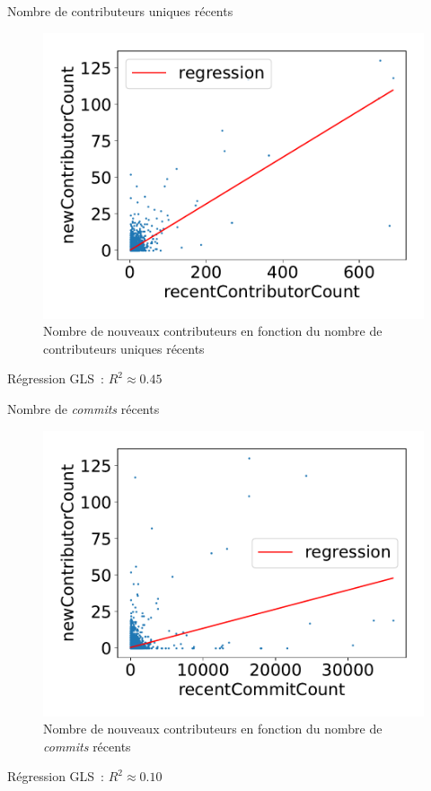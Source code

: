 \documentclass[usenames,dvipsnames,10pt]{beamer}
\begin{document}
\begin{frame}{Nombre de contributeurs uniques récents}
    \begin{figure}
        \includegraphics[width=.5\textwidth]{../experiment/data_analysis/recentContributorCountRegression_linearScale}
        \caption{%
            Nombre de nouveaux contributeurs en fonction du nombre de
            contributeurs uniques récents
        }
    \end{figure}

    Régression GLS : $R^2 \approx 0.45$

\end{frame}

\begin{frame}{Nombre de \emph{commits} récents}
    \begin{figure}
        \includegraphics[width=.5\textwidth]{../experiment/data_analysis/recentCommitCountRegression_linearScale}
        \caption{%
            Nombre de nouveaux contributeurs en fonction du nombre de
            \emph{commits} récents
        }
    \end{figure}

    Régression GLS : $R^2 \approx 0.10$

\end{frame}
\end{document}
